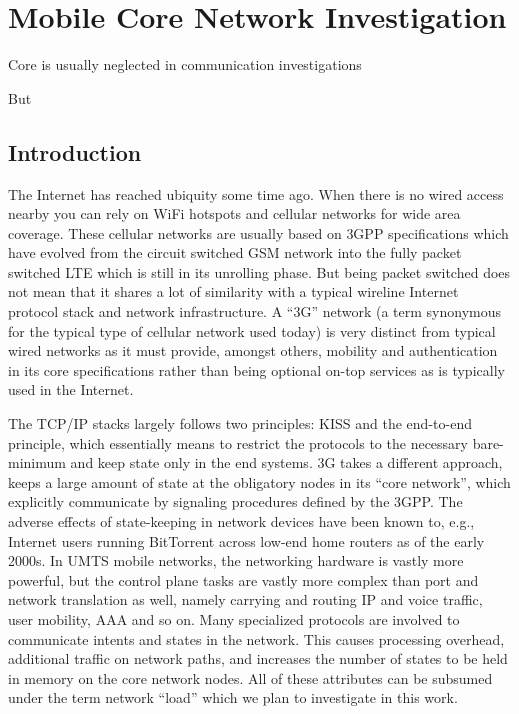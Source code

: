 \chapter{Mobile Core Network Investigation}
\label{chap:mobilenets}


Core is usually neglected in communication investigations

But 


\section{Introduction}
\label{c4:sec:introduction}


The Internet has reached ubiquity some time ago. When there is no wired access nearby you can rely on WiFi hotspots and cellular networks for wide area coverage. These cellular networks are usually based on \ac{3GPP} specifications which have evolved from the circuit switched \ac{GSM} network into the fully packet switched \ac{LTE} which is still in its unrolling phase. But being packet switched does not mean that it shares a lot of similarity with a typical wireline Internet protocol stack and network infrastructure. A ``3G'' network (a term synonymous for the typical type of cellular network used today) is very distinct from typical wired networks as it must provide, amongst others, mobility and authentication in its core specifications rather than being optional on-top services as is typically used in the Internet.

The TCP/IP stacks largely follows two principles: \ac{KISS} and the end-to-end principle\cite{saltzer1984end2end}, which essentially means to restrict the protocols to the necessary bare-minimum and keep state only in the end systems. 3G takes a different approach, keeps a large amount of state at the obligatory nodes in its ``core network'', which explicitly communicate by signaling procedures defined by the \ac{3GPP}.
The adverse effects of state-keeping in network devices have been known to, e.g.,  Internet users running BitTorrent across low-end home routers as of the early 2000s. In \ac{UMTS} mobile networks, the networking hardware is vastly more powerful, but the control plane tasks are vastly more complex than port and network translation as well, namely carrying and routing IP and voice traffic, user mobility, \ac{AAA} and so on. Many specialized protocols are involved to communicate intents and states in the network. This causes processing overhead, additional traffic on network paths, and increases the number of states to be held in memory on the core network nodes. All of these attributes can be subsumed under the term network ``load'' which we plan to investigate in this work.

